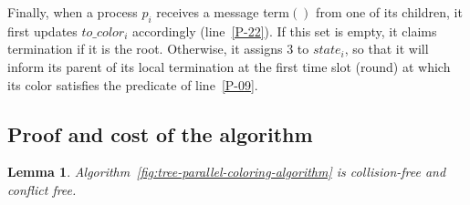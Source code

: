 \documentclass[11pt,english]{article}
\newtheorem{lemma}{Lemma}
\begin{document}
Finally, when a process $p_i$ receives a message {\sc term}$()$ from
one of its children, it first updates  $to\_color_i$ accordingly
(line~\ref{P-22}). If this set is empty, it claims termination if it
is the root. Otherwise, it assigns $3$ to $state_i$, so that it will
inform its parent of its local termination at the first time slot
(round) at which its color satisfies the predicate of line~\ref{P-09}.


\subsection{Proof  and cost of the algorithm}

\begin{lemma}
\label{lemma:par-noCollision-noConflict}
Algorithm~{\em\ref{fig:tree-parallel-coloring-algorithm}}
is collision-free and conflict free. 
\end{lemma}
\end{document}
